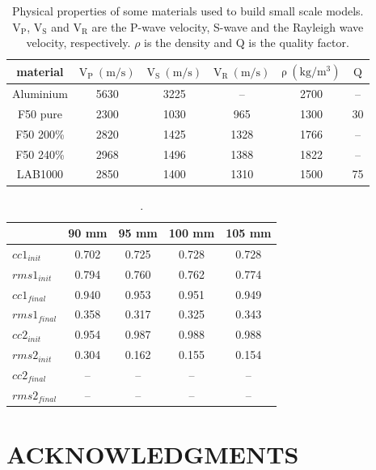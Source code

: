 \documentclass[manuscript,revised]{geophysics}
\begin{document}
\begin{table}[!ht]
	\centering
	\begin{tabular}{cccccc}
		\hline
		material & $\mathrm{V_{P}\ (m/s)}$ & $\mathrm{V_{S}\ (m/s)}$ & $\mathrm{V_{R}\ (m/s)}$ & $\mathrm{\rho\ (kg/m^{3})}$ & $\mathrm{Q}$ \\
		\hline
		Aluminium & 5630 & 3225 & --   & 2700 & --  \\
		F50 pure  & 2300 & 1030 & 965  & 1300 & 30  \\
		F50 200\% & 2820 & 1425 & 1328 & 1766 & --  \\
		F50 240\% & 2968 & 1496 & 1388 & 1822 & --  \\
		LAB1000   & 2850 & 1400 & 1310 & 1500 & 75  \\
		\hline
	\end{tabular}
	\caption{Physical properties of some materials used to build small scale models. $\mathrm{V_{P}}$, $\mathrm{V_{S}}$ and $\mathrm{V_{R}}$ are the P-wave velocity, S-wave and the Rayleigh wave velocity, respectively. $\rho$ is the density and $\mathrm{Q}$ is the quality factor.}
	\label{epoxy-resin}
\end{table}

\clearpage
\newpage

\begin{table}[!ht]
	\centering
	\begin{tabular}{lcccc}
		\hline
		\qquad & 90 mm & 95 mm & 100 mm & 105 mm \\
		\hline
		$cc1_{init}$  & 0.702 & 0.725 & 0.728 & 0.728 \\
		$rms1_{init}$ & 0.794 & 0.760 & 0.762 & 0.774 \\
		\hline
		$cc1_{final}$  & 0.940 & 0.953 & 0.951 & 0.949 \\
		$rms1_{final}$ & 0.358 & 0.317 & 0.325 & 0.343 \\
		\hline
		\hline
		$cc2_{init}$  & 0.954 & 0.987 & 0.988 & 0.988 \\
		$rms2_{init}$ & 0.304 & 0.162 & 0.155 & 0.154 \\
		\hline
		$cc2_{final}$  & --   & --    & --    & --    \\
		$rms2_{final}$ & --   & --    & --    & --    \\
		\hline
	\end{tabular}
	\caption{.}
	\label{cc-rms}
\end{table}

\clearpage
\newpage 

\section{ACKNOWLEDGMENTS}

\clearpage
\newpage

%

\end{document}
